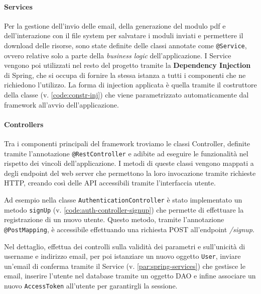 \paragraph{Services} \label{par:spring-services}
Per la gestione dell'invio delle email, della generazione del modulo pdf e
dell'interazione con il file system per salvatare i moduli inviati e permettere
il download delle risorse, sono state definite delle classi annotate come
\texttt{@Service}, ovvero relative solo a parte della \textit{business logic}
dell'applicazione. I Service vengono poi utilizzati nel resto del progetto
tramite la \textbf{Dependency Injection} di Spring, che si occupa di fornire la
stessa istanza a tutti i componenti che ne richiedono l'utilizzo. La forma di
injection applicata è quella tramite il costruttore della classe 
(v. \ref{code:constr-inj}) che viene parametrizzato automaticamente dal framework
all'avvio dell'applicazione.



\paragraph{Controllers}
Tra i componenti principali del framework troviamo le classi Controller, definite
tramite l'annotazione \texttt{@RestController} e adibite ad eseguire le funzionalità
nel rispetto dei vincoli dell'applicazione. I metodi di queste classi vengono
mappati a degli endpoint del web server che permettono la loro invocazione tramite
richieste HTTP, creando così delle API accessibili tramite l'interfaccia utente.

Ad esempio nella classe \texttt{AuthenticationController} è stato implementato un
metodo \texttt{signUp} (v. \ref{code:auth-controller-signup}) che permette di
effettuare la registrazione di un nuovo utente. Questo metodo, tramite
l'annotazione \texttt{@PostMapping}, è accessibile effettuando una richiesta POST
all'endpoint \textit{/signup}.

Nel dettaglio, effettua dei controlli sulla validità dei parametri e sull'unicità
di username e indirizzo email, per poi istanziare un nuovo oggetto \texttt{User},
inviare un'email di conferma tramite il Service (v. \autoref{par:spring-services})
che gestisce le email, inserire l'utente nel database tramite un oggetto DAO e
infine associare un nuovo \texttt{AccessToken} all'utente per garantirgli la sessione.

